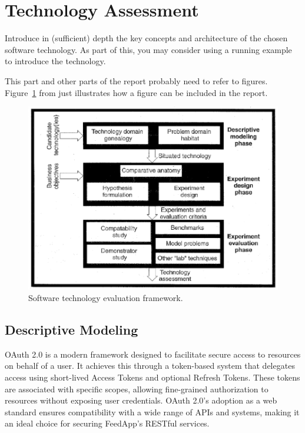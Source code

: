 \section{Technology Assessment}
\label{sec:technology}

Introduce in (sufficient) depth the key concepts and architecture of the chosen software technology. As part of this, you may consider using a running example to introduce the technology.

This part and other parts of the report probably need to refer to
figures. Figure~\ref{fig:framework} from \cite{brown:96} just
illustrates how a figure can be included in the report.

\begin{figure}[thb]
	\centering
	\includegraphics[scale=0.5]{figs/framework.png}
	\caption{Software technology evaluation framework.}
	\label{fig:framework}
\end{figure}

\subsection{Descriptive Modeling}
OAuth 2.0 is a modern framework designed to facilitate secure access to resources on behalf of a user. It achieves this through a token-based system that delegates access using short-lived Access Tokens and optional Refresh Tokens. These tokens are associated with specific scopes, allowing fine-grained authorization to resources without exposing user credentials. OAuth 2.0's adoption as a web standard ensures compatibility with a wide range of APIs and systems, making it an ideal choice for securing FeedApp’s RESTful services.

